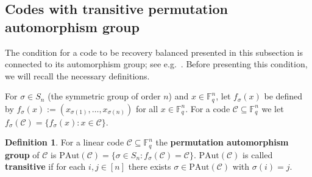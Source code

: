 \documentclass[11pt,a4paper,reqno,twoside]{amsart}
\theoremstyle{definition}
\newtheorem{definition}{Definition}
\newcommand{\F}{\mathbb{F}}
\newcommand{\mC}{\mathcal{C}}
\newcommand{\pcomment}[1]{{\color{purple}#1}}
\newcommand{\vcomment}[1]{{\color{violet}#1}}
\newcommand{\ey}[1]{{{\footnotesize [\pcomment{#1}\;\;\vcomment{--Eitan}]}}}
\begin{document}
\subsection{Codes with transitive permutation automorphism group}
The condition for a code to be recovery balanced presented in this subsection is connected to its automorphism group; see e.g.~\cite{macwilliams1977theory}. Before presenting this condition, we will recall the necessary definitions.

For $\sigma \in S_n$ (the symmetric group of order $n$) and $x \in \F_q^n$, let $f_\sigma(x)$ be defined by $f_\sigma(x):=(x_{\sigma(1)}, \ldots, x_{\sigma(n)})$ for all $x \in \F_q^n$. For a code $\mC \subseteq \F_q^n$ we let $f_{\sigma}(\mC) = \{f_{\sigma}(x) : x \in \mC\}$.

\begin{definition}
    For a linear code $\mC \subseteq \F_q^n$ the \textbf{permutation automorphism group} of $\mC$ is $\mbox{PAut}(\mC)=\{\sigma \in S_n : f_\sigma(\mC)=\mC\}$. $\mbox{PAut}(\mC)$ is called \textbf{transitive} if for each $i,j \in [n]$ there exists $\sigma \in \mbox{PAut}(\mC)$ with $\sigma(i)=j$.
\end{definition}

\end{document}
